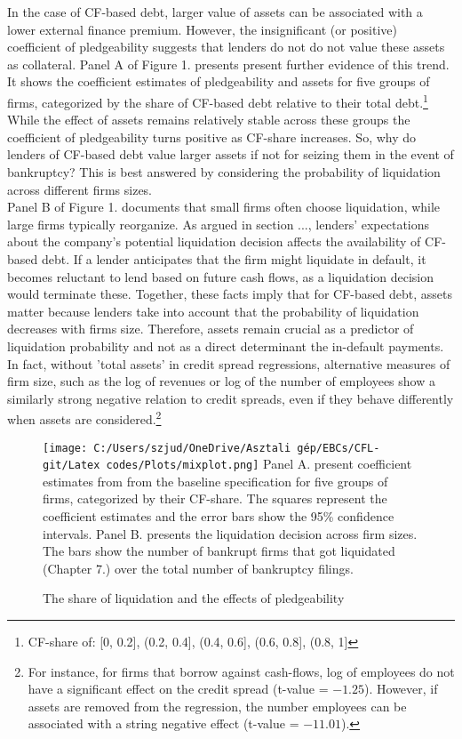 \documentclass[12pt]{article}
\begin{document}
In the case of CF-based debt, larger value of assets can be associated with a lower external finance premium. However, the insignificant (or positive) coefficient of pledgeability suggests that lenders do not do not value these assets as collateral. Panel A of Figure 1. presents present further evidence of this trend. It shows the coefficient estimates of pledgeability and assets for five groups of firms, categorized by the share of CF-based debt relative to their total debt.\footnote{CF-share of: [0, 0.2], (0.2, 0.4], (0.4, 0.6], (0.6, 0.8], (0.8, 1]} While the effect of assets remains relatively stable across these groups the coefficient of pledgeability turns positive as CF-share increases. So, why do lenders of CF-based debt value larger assets if not for seizing them in the event of bankruptcy?  This is best answered by considering the probability of liquidation across different firms sizes.  \vspace{3mm} \\
Panel B of Figure 1. documents that small firms often choose liquidation, while large firms typically reorganize. As argued in section ..., lenders' expectations about the company's potential liquidation decision affects the availability of CF-based debt. If a lender anticipates that the firm might liquidate in default, it becomes reluctant to lend based on future cash flows, as a liquidation decision would terminate these. Together, these facts imply that for CF-based debt, assets matter because lenders take into account that the probability of liquidation decreases with firms size. Therefore, assets remain crucial as a predictor of liquidation probability and not as a direct determinant the in-default payments. In fact, without 'total assets' in credit spread regressions, alternative measures of firm size, such as the log of revenues or log of the number of employees show a similarly strong negative relation to credit spreads, even if they behave differently when assets are considered.\footnote{For instance, for firms that borrow against cash-flows, log of employees do not have a significant effect on the credit spread (t-value = $-1.25$). However, if assets are removed from the regression, the number employees can be associated with a string negative effect (t-value = $-11.01$).  } \vspace{3mm} \\
\begin{figure}[H]  %
    \centering
    \caption{The share of liquidation and the effects of pledgeability} \label{chart:mixplot}
    \texttt{[image: C:/Users/szjud/OneDrive/Asztali gép/EBCs/CFL-git/Latex codes/Plots/mixplot.png]}
     \footnotesize \justifying Panel A. present coefficient estimates from from the baseline specification for five groups of firms, categorized by their CF-share. The squares represent the coefficient estimates and the error bars show the 95\%  confidence intervals. Panel B. presents the liquidation decision across firm sizes. The bars show the number of bankrupt firms that got liquidated (Chapter 7.) over the total number of bankruptcy filings.
\end{figure}
\newpage 
\end{document}
